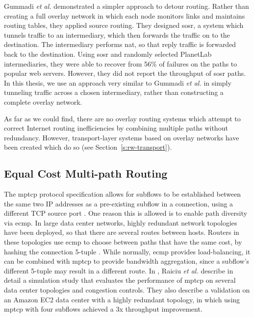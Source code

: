 \documentclass{cwru}
\begin{document}
Gummadi \textit{et al.} \cite{gummadi2004improving} demonstrated a simpler
approach to detour routing. Rather than creating a full overlay network in which
each node monitors links and maintains routing tables, they applied source
routing. They designed \ac{sosr}, a system which tunnels traffic to an
intermediary, which then forwards the traffic on to the destination. The
intermediary performs \ac{nat}, so that reply traffic is forwarded back to the
destination. Using \ac{sosr} and randomly selected PlanetLab intermediaries,
they were able to recover from 56\% of failures on the paths to popular web
servers. However, they did not report the throughput of \ac{sosr} paths. In this
thesis, we use an approach very similar to Gummadi \textit{et al.} in simply
tunneling traffic across a chosen intermediary, rather than constructing a
complete overlay network.

As far as we could find, there are no overlay routing systems which attempt to
correct Internet routing inefficiencies by combining multiple paths without
redundancy. However, transport-layer systems based on overlay networks have been
created which do so (see Section~\ref{s:rw-transport}).

\subsection{Equal Cost Multi-path Routing}

The \ac{mptcp} protocol specification allows for subflows to be established
between the same two IP addresses as a pre-existing subflow in a connection,
using a different TCP source port \cite{rfc6824}. One reason this is allowed is
to enable path diversity via \acf{ecmp}. In large data center networks, highly
redundant network topologies have been deployed, so that there are several
routes between hosts. Routers in these topologies use \ac{ecmp} to choose
between paths that have the same cost, by hashing the connection 5-tuple
\cite{raiciu2011improving}. While normally, \ac{ecmp} provides load-balancing,
it can be combined with \ac{mptcp} to provide bandwidth aggregation, since a
subflow's different 5-tuple may result in a different route. In
\cite{raiciu2011improving}, Raiciu \textit{et al.} describe in detail a
simulation study that evaluates the performance of \ac{mptcp} on several data
center topologies and congestion controls. They also describe a validation on an
Amazon EC2 data center with a highly redundant topology, in which using
\ac{mptcp} with four subflows achieved a 3x throughput improvement.
\end{document}
